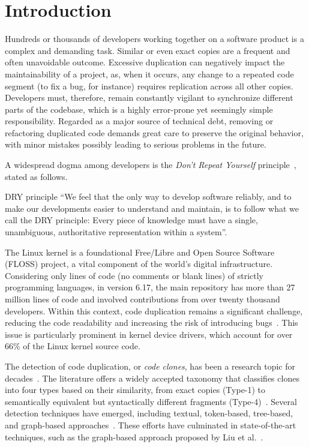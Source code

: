 \documentclass[10pt,conference]{IEEEtran}
\newenvironment{highlight-box}[1]{%
  \begin{tcolorbox}
  \textbf{#1:} \itshape}{\end{tcolorbox}}
\begin{document}

\IEEEpeerreviewmaketitle

\section{Introduction}
\label{sec:introduction}

Hundreds or thousands of developers working together on a software product is a complex and demanding task. Similar or even exact copies are a frequent and often unavoidable outcome. Excessive duplication can negatively impact the maintainability of a project, as, when it occurs, any change to a repeated code segment (to fix a bug, for instance) requires replication across all other copies. Developers must, therefore, remain constantly vigilant to synchronize different parts of the codebase, which is a highly error-prone yet seemingly simple responsibility. Regarded as a major source of technical debt, removing or refactoring duplicated code demands great care to preserve the original behavior, with minor mistakes possibly leading to serious problems in the future.

A widespread dogma among developers is the \textit{Don't Repeat Yourself} principle~\cite{pragmatic-programmer}, stated as follows.

\begin{highlight-box}{DRY principle}
  ``We feel that the only way to develop software reliably, and to make our
  developments easier to understand and maintain, is to follow what we call the
  DRY principle: Every piece of knowledge must have a single, unambiguous,
  authoritative representation within a system''.
\end{highlight-box}

The Linux kernel is a foundational Free/Libre and Open Source Software (FLOSS) project, a vital component of the world's digital infrastructure. Considering only lines of code (no comments or blank lines) of strictly programming languages, in version 6.17, the main repository has more than 27 million lines of code and involved contributions from over twenty thousand developers. Within this context, code duplication remains a significant challenge,  reducing the code readability and increasing the risk of introducing bugs~\cite{harmone,harmtwo}. This issue is particularly prominent in kernel device drivers, which account for over 66\% of the Linux kernel source code.

The detection of code duplication, or \textit{code clones}, has been a research topic for decades~\cite{firstman}. The literature offers a widely accepted taxonomy that classifies clones into four types based on their similarity, from exact copies (Type-1) to semantically equivalent but syntactically different fragments (Type-4)~\cite{litreview}. Several detection techniques have emerged, including textual, token-based, tree-based, and graph-based approaches~\cite{litreview}. These efforts have culminated in state-of-the-art techniques, such as the graph-based approach proposed by Liu et al.~\cite{tailor}.
\end{document}
